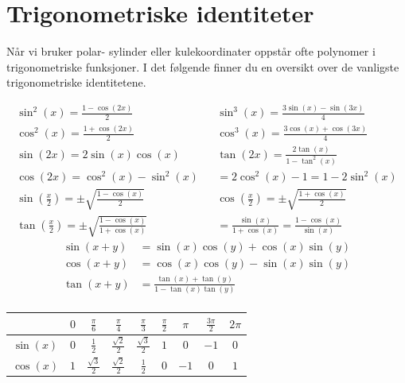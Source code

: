 \section{Trigonometriske identiteter}

Når vi bruker polar- sylinder eller kulekoordinater oppstår ofte polynomer i trigonometriske funksjoner. I det følgende finner du en oversikt over de vanligste trigonometriske identitetene.

\begin{align*}
\sin^2(x) = \frac{1 - \cos(2x)}{2} && \sin^3(x) = \frac{3\sin(x) - \sin(3x)}{4} \\
\cos^2(x) = \frac{1 + \cos(2x)}{2} && \cos^3(x) = \frac{3\cos(x) + \cos(3x)}{4} \\
\sin(2x) = 2\sin(x)\cos(x) && \tan(2x) = \frac{2\tan(x)}{1 - \tan^2(x)} \\
\cos(2x) = \cos^2(x) - \sin^2(x)  && = 2\cos^2(x) - 1 = 1 - 2\sin^2(x) \\
\sin\left(\frac{x}{2}\right) = \pm\sqrt{\frac{1 - \cos(x)}{2}} &&
\cos\left(\frac{x}{2}\right) = \pm\sqrt{\frac{1 + \cos(x)}{2}} \\
\tan\left(\frac{x}{2}\right) = \pm\sqrt{\frac{1 - \cos(x)}{1 + \cos(x)}} &&= \frac{\sin(x)}{1 + \cos(x)} = \frac{1 - \cos(x)}{\sin(x)}
\end{align*}
\begin{align*}
\sin(x + y) &= \sin(x)\cos(y) + \cos(x)\sin(y) \\
\cos(x + y) &= \cos(x)\cos(y) - \sin(x)\sin(y) \\
\tan(x + y) &= \frac{\tan(x) + \tan(y)}{1 - \tan(x)\tan(y)} \\
\end{align*}

\begin{center}
\renewcommand{\arraystretch}{1.5}
\setlength{\tabcolsep}{12pt}
\begin{tabular}{|c||c|c|c|c|c|c|c|c|}
\hline
& $0$ & $\tfrac{\pi}{6}$ & $\tfrac{\pi}{4}$ & $\tfrac{\pi}{3}$ & $\tfrac{\pi}{2}$ & $\pi$ & $\tfrac{3\pi}{2}$ & $2\pi$ \\
\hline\hline
$\sin(x)$ & $0$ & $\tfrac{1}{2}$ & $\tfrac{\sqrt{2}}{2}$ & $\tfrac{\sqrt{3}}{2}$ & $1$ & $0$ & $-1$ & $0$ \\
\hline
$\cos(x)$ & $1$ & $\tfrac{\sqrt{3}}{2}$ & $\tfrac{\sqrt{2}}{2}$ & $\tfrac{1}{2}$ & $0$ & $-1$ & $0$ & $1$ \\
\hline
\end{tabular}
\end{center}
\newpage

